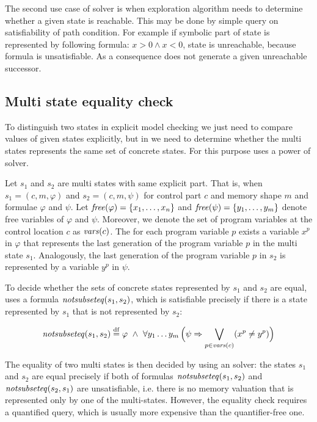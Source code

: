 The second use case of \SMT solver is when exploration algorithm needs to
determine whether a given state is reachable. This may be done by simple query
on satisfiability of path condition. For example if symbolic part of state is
represented by following formula: $x > 0 \wedge x < 0$, state is unreachable,
because formula is unsatisfiable. As a consequence \SymDIVINE does
not generate a given unreachable successor.

\subsection{Multi state equality check}\label{subsec:equality}

To distinguish two states in explicit model checking we just need to compare values of
given states explicitly, but in \SymDIVINE we need to determine whether the
multi states represents the same set of concrete states. For this purpose \SymDIVINE
uses a power of \SMT solver.

Let $s_1$ and $s_2$ are multi states with same explicit part. That is, when $s_1
= (c, m, \varphi)$ and $s_2 = (c, m, \psi)$ for control part $c$ and
memory shape $m$ and formulae $\varphi$ and $\psi$. Let $\mathit{free}(\varphi) = \{x_1,
\dots, x_n\}$ and
$\mathit{free}(\psi) = \{ y_1, \dots, y_m\}$ denote free variables of $\varphi$ and
$\psi$. Moreover, we denote the set of program variables at the control location
$c$ as $\mathit{vars}(c)$. The for each program variable $p$ exists a variable $x^p$ in
$\varphi$ that represents the last generation of the program  variable $p$ in
the multi state $s_1$. Analogously, the last generation of the program variable
$p$ in $s_2$ is represented by a variable $y^p$ in $\psi$.

To decide whether the sets of concrete states represented by $s_1$ and $s_2$ are
equal, \SymDIVINE uses a formula $\mathit{notsubseteq}(s_1, s_2)$, which is satisfiable
precisely if there is a state represented by $s_1$ that is not represented by
$s_2$:

\[
  \mathit{notsubseteq}(s_1, s_2) \stackrel{\mathrm{df}}{=} \varphi~\land~ \forall y_1 \ldots y_m
  \, \Big ( \psi \Rightarrow \bigvee_{p \in \mathit{vars}(c)} (x^p \not =
  y^p) \Big)
\]

The equality of two multi states is then decided by using an \SMT solver:
the states $s_1$ and $s_2$ are equal precisely if both of
formulas $\mathit{notsubseteq}(s_1, s_2)$ and $\mathit{notsubseteq}(s_2, s_1)$ are
unsatisfiable, i.e. there is no memory valuation that is represented
only by one of the multi-states. However, the equality check requires
a quantified \SMT query, which is usually more expensive than the
quantifier-free one.


